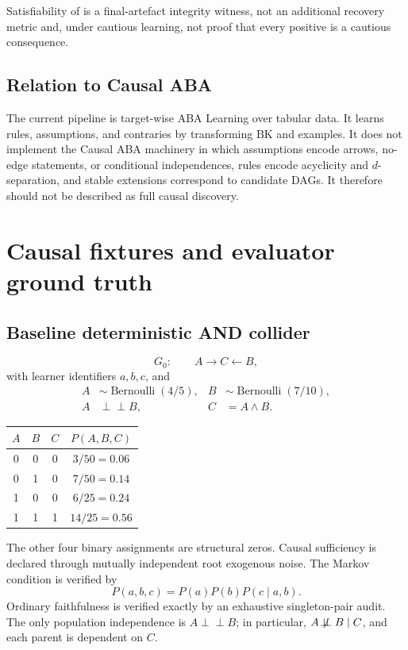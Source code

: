 \documentclass[11pt]{article}
\DeclareRobustCommand{\code}[1]{\texttt{\detokenize{#1}}}
\newcommand{\notindep}{\not\!\perp\!\!\!\perp}
\newcommand{\indep}{\perp\!\!\!\perp}
\begin{document}
Satisfiability of \code{bk.sol_chk.asp} is a final-artefact integrity witness,
not an additional recovery metric and, under cautious learning, not proof that
every positive is a cautious consequence.

\subsection{Relation to Causal ABA}

The current pipeline is target-wise ABA Learning over tabular data. It learns
rules, assumptions, and contraries by transforming BK and examples. It does
not implement the Causal ABA machinery in which assumptions encode arrows,
no-edge statements, or conditional independences, rules encode acyclicity and
\(d\)-separation, and stable extensions correspond to candidate DAGs. It
therefore should not be described as full causal discovery.

\section{Causal fixtures and evaluator ground truth}

\subsection{Baseline deterministic AND collider}

\[
G_0:\qquad A\longrightarrow C\longleftarrow B,
\]
with learner identifiers \(a,b,c\), and
\begin{align*}
A &\sim \operatorname{Bernoulli}(4/5),&
B &\sim \operatorname{Bernoulli}(7/10),\\
A &\indep B,& C&=A\land B.
\end{align*}

\begin{center}
\begin{tabular}{@{}cccc@{}}
\toprule
\(A\) & \(B\) & \(C\) & \(P(A,B,C)\) \\
\midrule
0 & 0 & 0 & \(3/50=0.06\) \\
0 & 1 & 0 & \(7/50=0.14\) \\
1 & 0 & 0 & \(6/25=0.24\) \\
1 & 1 & 1 & \(14/25=0.56\) \\
\bottomrule
\end{tabular}
\end{center}

The other four binary assignments are structural zeros. Causal sufficiency is
declared through mutually independent root exogenous noise. The Markov
condition is verified by
\[
P(a,b,c)=P(a)P(b)P(c\mid a,b).
\]
Ordinary faithfulness is verified exactly by an exhaustive singleton-pair
audit. The only population independence is \(A\indep B\); in particular,
\(A\notindep B\mid C\), and each parent is dependent on \(C\).
\end{document}
